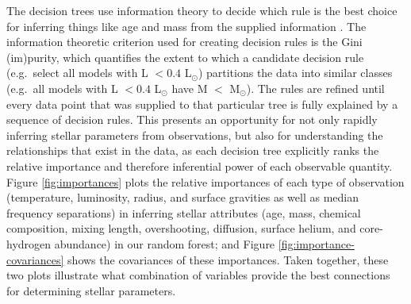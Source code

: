 \documentclass[manuscript]{aastex}
\begin{document}
The decision trees use information theory to decide which rule is the best choice for inferring things like age and mass from the supplied information \citep[see chapter 9 of][]{hastie2005elements}. The information theoretic criterion used for creating decision rules is the Gini (im)purity, which quantifies the extent to which a candidate decision rule (e.g.~select all models with L $<0.4$ L$_\odot$) partitions the data into similar classes (e.g.~all models with L $<0.4$ L$_\odot$ have M $<$ M$_\odot$). The rules are refined until every data point that was supplied to that particular tree is fully explained by a sequence of decision rules. This presents an opportunity for not only rapidly inferring stellar parameters from observations, but also for understanding the relationships that exist in the data, as each decision tree explicitly ranks the relative importance and therefore inferential power of each observable quantity. Figure \ref{fig:importances} plots the relative importances of each type of observation (temperature, luminosity, radius, and surface gravities as well as median frequency separations) in inferring stellar attributes (age, mass, chemical composition, mixing length, overshooting, diffusion, surface helium, and core-hydrogen abundance) in our random forest; and Figure \ref{fig:importance-covariances} shows the covariances of these importances. Taken together, these two plots illustrate what combination of variables provide the best connections for determining stellar parameters.
\end{document}
